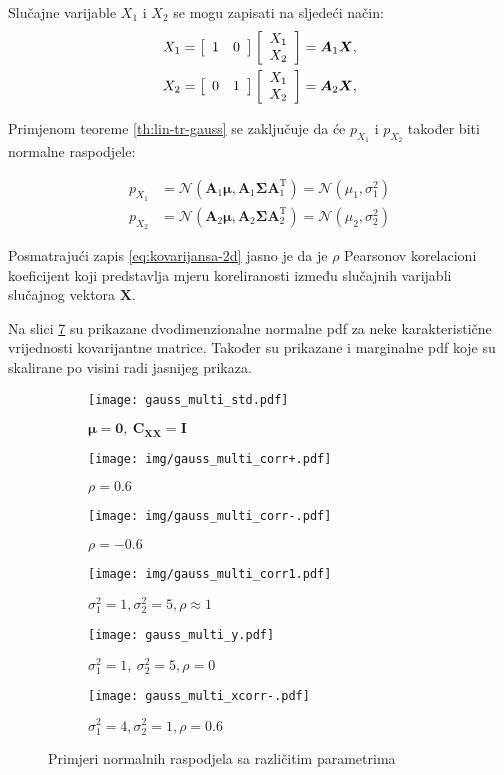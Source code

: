 Slučajne varijable $X_1$ i $X_2$ se mogu zapisati na sljedeći način:
\begin{eqnarray}
	X_1 = \left[\begin{array}{cc}1&0\end{array}\right] \left[\begin{array}{c}X_1\\X_2\end{array}\right] = \bm A_1 \bm X,
	\\
	X_2 = \left[\begin{array}{cc}0&1\end{array}\right] \left[\begin{array}{c}X_1\\X_2\end{array}\right] = \bm A_2 \bm X,
\end{eqnarray}

Primjenom teoreme \ref{th:lin-tr-gauss} se zaključuje da će $p_{X_1}$ i
$p_{X_2}$ također biti normalne raspodjele:

\begin{align*}
	p_{X_1} &= \mathcal{N}(\bm A_1\bm\mu, \bm A_1 \bm\Sigma \bm A_1^\mathrm T)
		= \mathcal{N}(\mu_1, \sigma_1^2) \\
	p_{X_2} &= \mathcal{N}(\bm A_2\bm\mu, \bm A_2 \bm\Sigma \bm A_2^\mathrm T)
		= \mathcal{N}(\mu_2, \sigma_2^2)
\end{align*}

Posmatrajući zapis \eqref{eq:kovarijansa-2d} jasno je da je $\rho$ Pearsonov
korelacioni koeficijent koji predstavlja mjeru koreliranosti između slučajnih
varijabli slučajnog vektora $\bm X$.

Na slici \ref{fig:gauss2} su prikazane dvodimenzionalne normalne pdf za neke
karakteristične vrijednosti kovarijantne matrice. Također su prikazane i
marginalne pdf koje su skalirane po visini radi jasnijeg prikaza.

\begin{figure}[H]
  \centering
	\begin{subfigure}[b]{0.3\textwidth}
		\centering
		\texttt{[image: gauss\_multi\_std.pdf]}
		\caption{$\bm\mu=\bm 0,\ \bm C_{\bm X\bm X} = \bm I$}
		\label{fig:gauss2a}
	\end{subfigure}
	\begin{subfigure}[b]{0.3\textwidth}
		\centering
    \texttt{[image: img/gauss\_multi\_corr+.pdf]}
    \caption{$\rho = 0.6$}
		\label{fig:gauss2b}
	\end{subfigure}
	\begin{subfigure}[b]{0.3\textwidth}
		\centering
    \texttt{[image: img/gauss\_multi\_corr-.pdf]}
    \caption{$\rho = -0.6$}
		\label{fig:gauss2c}
	\end{subfigure}
	\begin{subfigure}[b]{0.3\textwidth}
		\centering
    \texttt{[image: img/gauss\_multi\_corr1.pdf]}
    \caption{$\sigma_1^2=1, \sigma_2^2=5, \rho \approx 1$}
		\label{fig:gauss2e}
	\end{subfigure}
	\begin{subfigure}[b]{0.3\textwidth}
		\centering
    \texttt{[image: gauss\_multi\_y.pdf]}
    \caption{$\sigma_1^2=1,\ \sigma_2^2=5, \rho=0$}
		\label{fig:gauss2d}
	\end{subfigure}
	\begin{subfigure}[b]{0.3\textwidth}
		\centering
    \texttt{[image: gauss\_multi\_xcorr-.pdf]}
    \caption{$\sigma_1^2=4, \sigma_2^2=1, \rho=0.6$}
		\label{fig:gauss2f}
	\end{subfigure}
	\caption{Primjeri normalnih raspodjela sa različitim parametrima}
	\label{fig:gauss2}
\end{figure}

